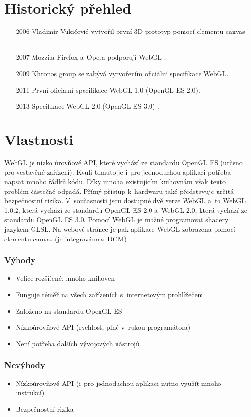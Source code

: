\documentclass[12pt,a4paper,titlepage,final]{report}
\begin{document}
\section{Historický přehled}
\begin{itemize}
	\item[2006] Vladimír Vukićević vytvořil první 3D prototyp pomocí elementu canvas \cite{history}.
	\item[2007] Mozzila Firefox a~Opera podporují WebGL \cite{history}.
	\item[2009] Khronos group se zabývá vytvořením oficiální specifikace WebGL.
	\item[2011] První oficialní specifikace WebGL 1.0 (OpenGL ES 2.0)\cite{history}.
	\item[2013] Specifikace WebGL 2.0 (OpenGL ES 3.0) \cite{history2}.
\end{itemize}

\section{Vlastnosti}
WebGL je nízko úrovňové API, které vychází ze standardu OpenGL ES (určeno pro vestavěné zařízení). Kvůli tomuto je i~pro jednoduchou aplikaci potřeba napsat mnoho řádků kódu. Díky mnoha existujícím knihovnám však tento problém částečně odpadá. Přímý přístup k~hardwaru také představuje určitá bezpečnostní rizika. V~současnosti jsou dostupné dvě verze WebGL a~to WebGL 1.0.2, která vychází ze standardu OpenGL ES 2.0 a~WebGL 2.0, která vychází ze standardu OpenGL ES 3.0. Pomocí WebGL je možné programovat shadery jazykem GLSL. Na webové stránce je pak aplikace WebGL zobrazena pomocí elementu canvas (je integrováno s~DOM) \cite{khronos}.

\subsubsection{Výhody}
\begin{itemize}
	\item Velice rozšířené, mnoho knihoven
	\item Funguje téměř na všech zařízeních s~internetovým prohlížečem	
	\item Založeno na standardu OpenGL ES
  \item Nízkoúrovňové API (rychlost, plně v~rukou programátora)
  \item Není potřeba dalších vývojových nástrojů
\end{itemize}
\subsubsection{Nevýhody}
\begin{itemize}
	\item Nízkoúrovňové API (i~pro jednoduchou aplikaci nutno využít mnoho instrukcí)
	\item Bezpečnostní rizika	
\end{itemize}
\end{document}
